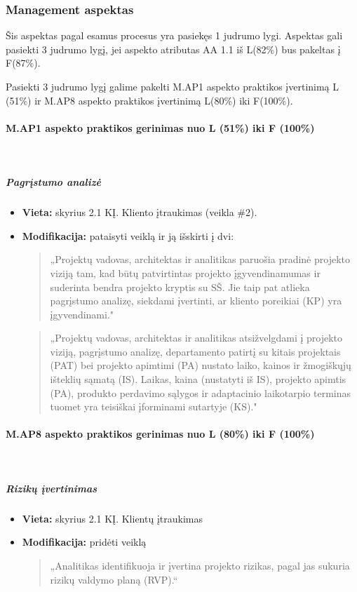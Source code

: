 \documentclass{article}
\newcommand{\subsubsubsection}[1]{\paragraph{#1}\mbox{}\\}
\begin{document}
\subsubsection{Management aspektas}

Šis aspektas pagal esamus procesus yra pasiekęs 1 judrumo lygi. Aspektas gali pasiekti 3 judrumo lygį, jei
aspekto atributas AA 1.1 iš L(82\%) bus pakeltas į F(87\%).

Pasiekti 3 judrumo lygį galime pakelti M.AP1 aspekto praktikos įvertinimą L (51\%) ir M.AP8 aspekto praktikos įvertinimą L(80\%) iki F(100\%).

\subsubsubsection{M.AP1 aspekto praktikos gerinimas nuo L (51\%) iki F (100\%)}
\vspace{-15pt} %
\subparagraph{Pagrįstumo analizė}
\begin{itemize}
    \item \textbf{Vieta:} skyrius 2.1 KĮ. Kliento įtraukimas (veikla \#2).
    \item \textbf{Modifikacija:} pataisyti veiklą ir ją išskirti į dvi:
    \begin{quote}
        „Projektų vadovas, architektas ir analitikas paruošia pradinė projekto viziją tam, kad būtų patvirtintas projekto įgyvendinamumas ir suderinta bendra projekto kryptis su SŠ. Jie taip pat atlieka pagrįstumo analizę, siekdami įvertinti, ar kliento poreikiai (KP) yra įgyvendinami." 
    \end{quote}
    
    \begin{quote}
        „Projektų vadovas, architektas ir analitikas  atsižvelgdami į projekto viziją, pagrįstumo analizę, departamento patirtį su kitais projektais (PAT) bei projekto apimtimi (PA) nustato laiko, kainos ir žmogiškųjų išteklių sąmatą (IS). Laikas, kaina (nustatyti iš IS), projekto apimtis (PA), produkto perdavimo sąlygos ir adaptacinio laikotarpio terminas tuomet yra teisiškai įforminami sutartyje (KS)."
    \end{quote}
\end{itemize}

\subsubsubsection{M.AP8 aspekto praktikos gerinimas nuo L (80\%) iki F (100\%)}

\subparagraph{Rizikų įvertinimas}
\begin{itemize}
    \item \textbf{Vieta:} skyrius 2.1 KĮ. Klientų įtraukimas
    \item \textbf{Modifikacija:} pridėti veiklą
    \begin{quote}
        „Analitikas identifikuoja ir įvertina projekto rizikas, pagal jas sukuria rizikų valdymo planą (RVP).“
    \end{quote}
\end{itemize}
\end{document}
